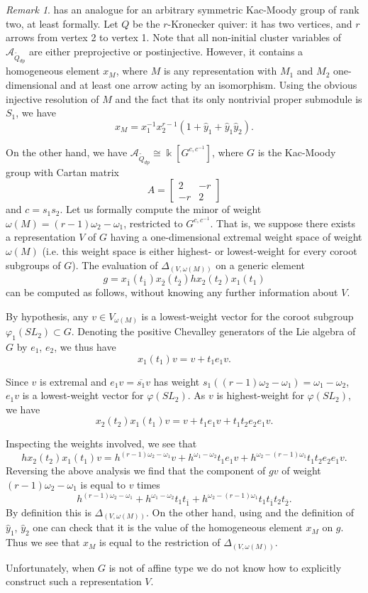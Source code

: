 \documentclass[12pt]{amsart}
\newcommand{\cA}{\mathcal{A}}
\newcommand{\kk}{\Bbbk}
\newcommand{\gv}{\omega}
\newcommand{\grep}{\gv}
\newcommand{\ol}[1]{\overline{#1}}
\newcommand{\Qdp}{\widetilde{Q}_{dp}}
\newcommand{\Qrep}{M}
\theoremstyle{remark}
\newtheorem{remark}[theorem]{Remark}
\numberwithin{equation}{section}
\numberwithin{figure}{section}
\begin{document}
\begin{remark}\label{rmk:nonaffinehomelt}
   has an analogue for an arbitrary symmetric Kac-Moody group of rank two, at least formally.
  Let $Q$ be the $r$-Kronecker quiver: it has two vertices, and $r$ arrows from vertex 2 to vertex 1.
  Note that all non-initial cluster variables of $\cA_{\Qdp}$ are either preprojective or postinjective.
  However, it contains a homogeneous element $x_M$, where $M$ is any representation with $M_1$ and $M_2$ one-dimensional and at least one arrow acting by an isomorphism.
  Using the obvious injective resolution of $M$ and the fact that its only nontrivial proper submodule is $S_1$, we have
  \[
    x_M = x_1^{-1}x_2^{r-1}(1 + \hat{y}_1 + \hat{y}_1 \hat{y}_2).
  \]
  
  On the other hand, we have $\cA_{\Qdp} \cong \kk[G^{c,c^{-1}}]$, where $G$ is the Kac-Moody group with Cartan matrix 
  \[
    A = \begin{bmatrix} 2 & -r \\ -r & 2 \end{bmatrix}
  \]
  and $c = s_1 s_2$.
  Let us formally compute the minor of weight $\grep(\Qrep) = (r-1) \omega_2 - \omega_1$, restricted to $G^{c,c^{-1}}$. 
That is, we suppose there exists a representation $V$ of $G$ having a one-dimensional extremal weight space of weight $\grep(\Qrep)$ (i.e. this weight space is either highest- or lowest-weight for every coroot subgroups of $G$). The evaluation of $\Delta_{(V,\grep(M))}$ on a generic element
\[
g = x_{\ol{1}}(t_{\ol{1}}) x_{\ol{2}}(t_{\ol{2}})hx_2(t_2)x_1(t_1)
\]
can be computed as follows, without knowing any further information about $V$. 

By hypothesis, any $v \in V_{\grep(\Qrep)}$ is a lowest-weight vector for the coroot subgroup $\varphi_1(SL_2) \subset G$. Denoting the positive Chevalley generators of the Lie algebra of $G$ by $e_1$, $e_2$, we thus have
\[
x_1(t_1)v = v + t_1e_1v.
\]

Since $v$ is extremal and $e_1v = \ol{s_1}v$ has weight $s_1((r-1) \omega_2 - \omega_1) = \omega_1 - \omega_2$, $e_1v$ is a lowest-weight vector for $\varphi(SL_2)$. As $v$ is highest-weight for $\varphi(SL_2)$, we have
\[
x_2(t_2)x_1(t_1)v = v + t_1e_1v + t_1t_2e_2e_1v.
\]

Inspecting the weights involved, we see that
\[
hx_2(t_2)x_1(t_1)v = h^{(r-1) \omega_2 - \omega_1}v + h^{\omega_1-\omega_2}t_1e_1v + h^{\omega_2 - (r-1)\omega_1}t_1t_2e_2e_1v.
\]
Reversing the above analysis we find that the component of $gv$ of weight $(r-1)\omega_2 - \omega_1$ is equal to $v$ times
\[
h^{(r-1) \omega_2 - \omega_1} + h^{\omega_1-\omega_2}t_1t_{\ol{1}} + h^{\omega_2 - (r-1)\omega_1}t_1t_{\ol{1}}t_2t_{\ol{2}}.
\]
By definition this is $\Delta_{(V,\grep(M))}$. On the other hand, using  and the definition of $\hat{y}_1$, $\hat{y}_2$ one can check that it is the value of the homogeneous element $x_M$ on $g$. Thus we see that $x_M$ is equal to the restriction of $\Delta_{(V,\grep(M))}$. 

Unfortunately, when $G$ is not of affine type we do not know how to explicitly construct such a representation $V$.
\end{remark}



\end{document}
